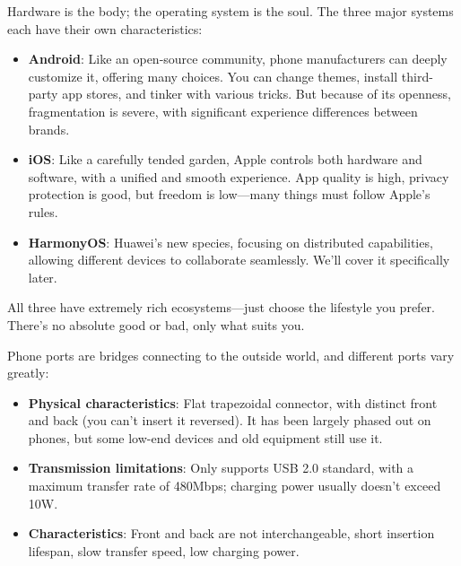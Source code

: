 
Hardware is the body; the operating system is the soul. The three major systems each have their own characteristics:

\begin{itemize}
  \item \textbf{Android}: Like an open-source community, phone manufacturers can deeply customize it, offering many choices. You can change themes, install third-party app stores, and tinker with various tricks. But because of its openness, fragmentation is severe, with significant experience differences between brands.
  \item \textbf{iOS}: Like a carefully tended garden, Apple controls both hardware and software, with a unified and smooth experience. App quality is high, privacy protection is good, but freedom is low—many things must follow Apple's rules.
  \item \textbf{HarmonyOS}: Huawei's new species, focusing on distributed capabilities, allowing different devices to collaborate seamlessly. We'll cover it specifically later.
\end{itemize}

All three have extremely rich ecosystems—just choose the lifestyle you prefer. There's no absolute good or bad, only what suits you.


Phone ports are bridges connecting to the outside world, and different ports vary greatly:


\begin{itemize}
  \item \textbf{Physical characteristics}: Flat trapezoidal connector, with distinct front and back (you can't insert it reversed). It has been largely phased out on phones, but some low-end devices and old equipment still use it.
  \item \textbf{Transmission limitations}: Only supports USB 2.0 standard, with a maximum transfer rate of 480Mbps; charging power usually doesn't exceed 10W.
  \item \textbf{Characteristics}: Front and back are not interchangeable, short insertion lifespan, slow transfer speed, low charging power.
\end{itemize}


